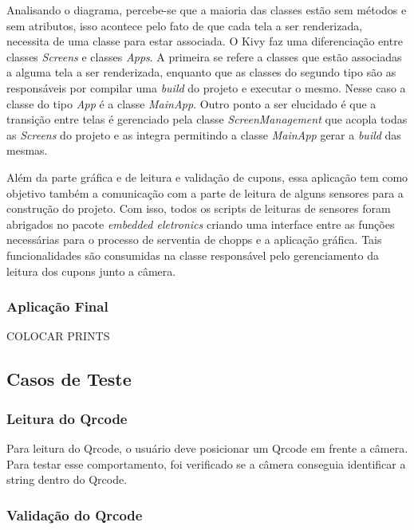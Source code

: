 Analisando o diagrama, percebe-se que a maioria das classes estão sem métodos e sem atributos,
isso acontece pelo fato de que cada tela a ser renderizada, necessita de uma classe para estar
associada. O Kivy faz uma diferenciação entre classes \textit{Screens} e classes \textit{Apps}.
A primeira se refere a classes que estão associadas a alguma tela a ser renderizada, enquanto
que as classes do segundo tipo são as responsáveis por compilar uma \textit{build} do projeto
e executar o mesmo. Nesse caso a classe do tipo \textit{App} é a classe \textit{MainApp}. Outro
ponto a ser elucidado é que a transição entre telas é gerenciado pela classe
\textit{ScreenManagement} que acopla todas as \textit{Screens} do projeto e as integra permitindo
a classe \textit{MainApp} gerar a \textit{build} das mesmas.

Além da parte gráfica e de leitura e validação de cupons, essa aplicação tem como objetivo
também a comunicação com a parte de leitura de alguns sensores para a construção do projeto.
Com isso, todos os scripts de leituras de sensores foram abrigados no pacote
\textit{embedded eletronics} criando uma interface entre as funções necessárias para o processo
de serventia de chopps e a aplicação gráfica. Tais funcionalidades são consumidas na classe
responsável pelo gerenciamento da leitura dos cupons junto a câmera.

\subsubsection{Aplicação Final}

COLOCAR PRINTS

\subsection{Casos de Teste}

\subsubsection{Leitura do Qrcode}

Para leitura do Qrcode, o usuário deve posicionar um Qrcode em frente a câmera. Para testar esse comportamento, foi verificado se a câmera conseguia identificar a string dentro do Qrcode.

\subsubsection{Validação do Qrcode}

